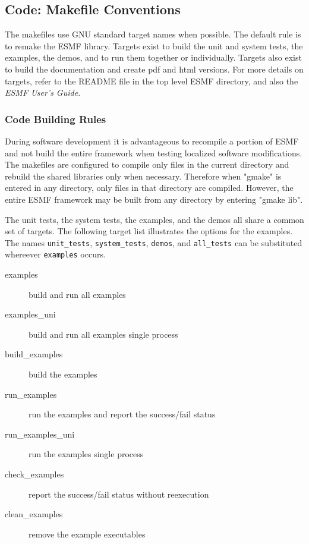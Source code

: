 
\subsection{Code: Makefile Conventions} 	 

The makefiles use GNU standard target names when possible.
The default rule is to remake the ESMF library.  Targets exist
to build the unit and system tests, the examples, the demos,
and to run them together or individually.  Targets also exist
to build the documentation and create pdf and html versions.
For more details on targets, refer to the README file in the top
level ESMF directory, and also the {\it ESMF User's Guide}.


\subsubsection{Code Building Rules} 
During software development it is advantageous to recompile a portion of
ESMF and not build the entire framework when testing localized software
modifications.  The makefiles are configured to compile only files in the
current directory and rebuild the shared libraries only when necessary.
Therefore when "gmake" is entered in any directory, only files in that
directory are compiled.  However, the entire ESMF framework may be built
from any directory by entering "gmake lib".

The unit tests, the system tests, the examples, and the demos all share
a common set of targets.  The following target list illustrates the
options for the examples.  The names {\tt unit\_tests}, {\tt system\_tests},
{\tt demos}, and {\tt all\_tests} can be substituted whereever {\tt examples}
occurs.
\begin{description} 
\item [examples] build and run all examples
\item [examples\_uni] build and run all examples single process
\item [build\_examples] build the examples
\item [run\_examples] run the examples and report the success/fail status
\item [run\_examples\_uni] run the examples single process
\item [check\_examples] report the success/fail status without reexecution
\item [clean\_examples] remove the example executables
\end{description} 

